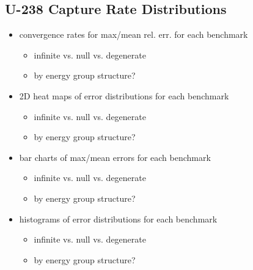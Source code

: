 \subsection{U-238 Capture Rate Distributions}

\begin{itemize}[noitemsep]
  \item convergence rates for max/mean rel. err. for each benchmark
  \begin{itemize}[noitemsep]
    \item infinite vs. null vs. degenerate
    \item by energy group structure?
  \end{itemize}
  \item 2D heat maps of error distributions for each benchmark
  \begin{itemize}[noitemsep]
    \item infinite vs. null vs. degenerate
    \item by energy group structure?
  \end{itemize}
  \item bar charts of max/mean errors for each benchmark
  \begin{itemize}[noitemsep]
    \item infinite vs. null vs. degenerate
    \item by energy group structure?
  \end{itemize}
  \item histograms of error distributions for each benchmark
  \begin{itemize}[noitemsep]
    \item infinite vs. null vs. degenerate
    \item by energy group structure?
  \end{itemize}
\end{itemize}

